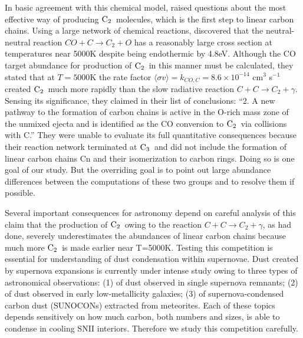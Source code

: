 \documentclass[manuscript]{aastex}
\newcommand{\ctwo}{${\rm C}_2$}
\newcommand{\cthree}{${\rm C}_3$}
\begin{document}
In basic agreement with this chemical model, \citet{2009ApJ...703..642C} raised
questions about the most effective way of producing \ctwo\ molecules,
which is the
first step to linear carbon chains. Using a large network of chemical
reactions, \citet{2009ApJ...703..642C} discovered that the neutral-neutral
reaction $CO + C \to C_2 + O$
has a reasonably large cross section at temperatures near
5000K despite being endothermic by 4.8eV. Although the CO target abundance for
production of \ctwo\ in this manner must be calculated, they stated that at
$T=5000$K the rate factor
$\langle \sigma v \rangle = k_{CO,C} = 8.6 \times 10^{-14}$ cm$^3$ s$^{-1}$
created \ctwo\ much more
rapidly than the slow radiative reaction $C + C \to C_2 + \gamma$.
Sensing its significance,
they claimed in their list of conclusions: ``2. A new pathway to the formation
of carbon chains is active in the O-rich mass zone of the unmixed ejecta and
is identified as the CO conversion to \ctwo\ via collisions with C.''  They were
unable to evaluate its full quantitative consequences because their reaction
network terminated at \cthree\
and did not include the formation of linear carbon
chains Cn and their isomerization to carbon rings. Doing so is one goal of our
study. But the overriding goal is to point out large abundance differences
between the computations of these two groups and to resolve them if possible. 

Several important consequences for astronomy depend on careful
analysis of this claim that the production of \ctwo\ owing to the reaction
$C+C \to C_2 + \gamma$, as \citet{1999Sci...283.1290C,2001ApJ...562..480C}
had done, severely
underestimates the abundances of linear carbon chains because much more \ctwo\
is made earlier \citep{2010ApJ...713....1C} near T=5000K. Testing this
competition is essential for understanding of dust condensation within
supernovae. Dust created by supernova expansions is currently under intense
study owing to three types of astronomical observations: (1) of dust observed
in single supernova remnants; (2) of dust observed in early low-metallicity
galaxies; (3) of supernova-condensed carbon dust (SUNOCONs) extracted from
meteorites. Each of these topics depends sensitively on how much carbon,
both numbers and sizes, is able to condense in cooling SNII interiors.
Therefore we study this competition carefully.
\end{document}
